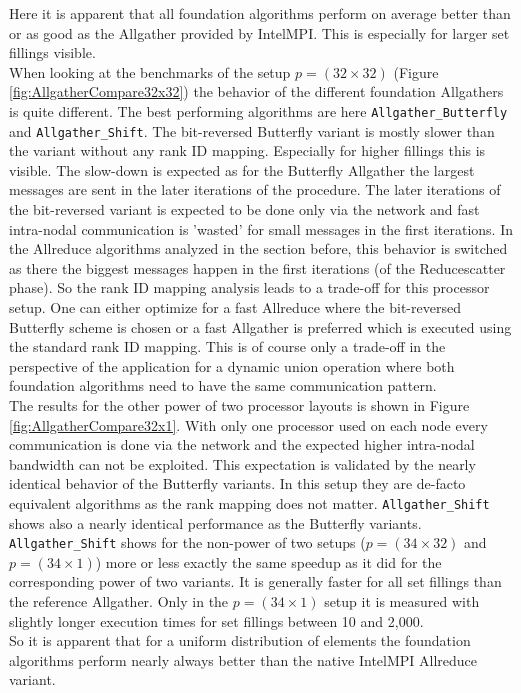 Here it is apparent that all foundation algorithms perform on average better than or as good as the Allgather provided by IntelMPI. This is especially for larger set fillings visible.\\
When looking at the benchmarks of the setup $p=(32\times32)$ (Figure \ref{fig:AllgatherCompare32x32}) the behavior of the different foundation Allgathers is quite different. The best performing algorithms are here \texttt{All\-gath\-er\_But\-ter\-fly} and \texttt{All\-gath\-er\-\_\-Shift}. The bit-reversed Butterfly variant is mostly slower than the variant without any rank ID mapping. Especially for higher fillings this is visible. The slow-down is expected as for the Butterfly Allgather the largest messages are sent in the later iterations of the procedure. The later iterations of the bit-reversed variant is expected to be done only via the network and fast intra-nodal communication is 'wasted' for small messages in the first iterations. In the Allreduce algorithms analyzed in the section before, this behavior is switched as there the biggest messages happen in the first iterations (of the Reducescatter phase). So the rank ID mapping analysis leads to a trade-off for this processor setup. One can either optimize for a fast Allreduce where the bit-reversed Butterfly scheme is chosen or a fast Allgather is preferred which is executed using the standard rank ID mapping. This is of course only a trade-off in the perspective of the application for a dynamic union operation where both foundation algorithms need to have the same communication pattern.\\
The results for the other power of two processor layouts is shown in Figure \ref{fig:AllgatherCompare32x1}. With only 
one processor used on each node every communication is done via the network and the expected higher intra-nodal bandwidth can not be exploited. This expectation is validated by the nearly identical behavior of the Butterfly variants. In this setup they are de-facto equivalent algorithms as the rank mapping does not matter. \texttt{All\-gath\-er\-\_\-Shift} shows also a nearly identical performance as the Butterfly variants.\\
\texttt{All\-gath\-er\-\_\-Shift} shows for the non-power of two setups ($p=(34\times32)$ and $p=(34\times1)$) more or less exactly the same speedup as it did for the corresponding power of two variants. It is generally faster for all set fillings than the reference Allgather. Only in the $p=(34\times1)$ setup it is measured with slightly longer execution times for set fillings between 10 and 2,000.\\
So it is apparent that for a uniform distribution of elements the foundation algorithms perform nearly always better than the native IntelMPI Allreduce variant.

